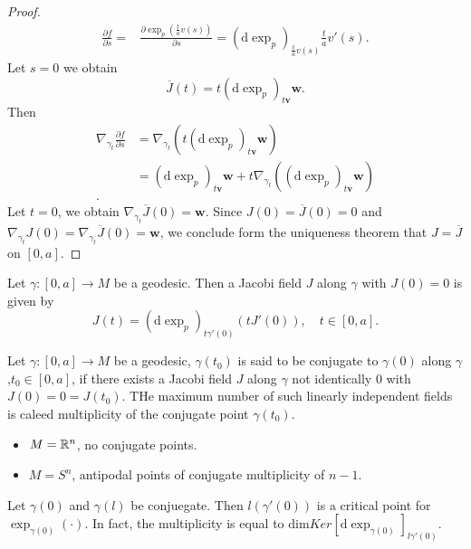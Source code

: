 \begin{proof}
  \begin{align*}
    \frac{\partial f}{\partial s} =& \frac{\partial \exp_p\left( \frac{t}{a}v(s) \right) }{\partial s}=(\mathrm{d}\exp_p)_{ \frac{t}{a}v(s)} \frac{t}{a}v'(s) 
  .\end{align*}
  Let $s=0$ we obtain
  \[
    \overline{J}(t)=t\left( \mathrm{d}\exp_p \right) _{t \mathbf{v}}\mathbf{w}.
  \] 
  Then
  \begin{align*}
    \nabla _{\gamma_t} \frac{\partial f}{\partial s} &= \nabla _{\gamma_t}\left( t\left( \mathrm{d}\exp_p \right) _{t\mathbf{v}}\mathbf{w} \right)  \\
    &= \left( \mathrm{d}\exp_p \right) _{t\mathbf{v}} \mathbf{w}+ t \nabla _{\gamma_t}\left( \left( \mathrm{d}\exp_p \right) _{t\mathbf{v}}\mathbf{w} \right)    \\
  .\end{align*}
  Let $t=0$, we obtain $\nabla _{\gamma_t} \overline{J}(0)=\mathbf{w}$. Since $J(0)=\overline{J}(0)=0$ and $\nabla _{\gamma_t}J(0)=\nabla _{\gamma_t}\overline{J}(0)=\mathbf{w}$, we conclude form the uniqueness theorem that $J=\overline{J}$ on $[0,a]$.
\end{proof}
\begin{corollary}
  Let $\gamma:[0,a]\to M$ be a geodesic. Then a Jacobi field $J$ along $\gamma$ with $J(0)=0$ is given by 
  \begin{equation}
    J(t)=\left( \mathrm{d}\exp_p \right) _{t\gamma'(0)}\left( tJ'(0) \right),\quad t\in[0,a]. 
  \end{equation}
\end{corollary}
\begin{definition}
  Let $\gamma:[0,a]\to M$ be a geodesic, $\gamma(t_0)$ is said to be conjugate to $\gamma(0)$ along $\gamma$,$t_0\in[0,a]$, if there exists a Jacobi field $J$ along $\gamma$ not identically $0$ with $J(0)=0=J(t_0)$. THe maximum number of such linearly independent fields is caleed multiplicity of the conjugate point $\gamma(t_0)$.
\end{definition}
\begin{example}
  \begin{itemize}
    \item $M=\mathbb{R}^{n}$, no conjugate points.
    \item $M=S^n$, antipodal points of conjugate multiplicity of $n-1$.
  \end{itemize}
\end{example}
\begin{proposition}
  Let $\gamma(0)$ and $\gamma(l)$ be conjuegate. Then $l\left( \gamma'(0) \right) $ is a critical point for $\exp_{\gamma(0)}(\cdot )$. In fact, the multiplicity is equal to $\mathrm{dim}{Ker}[\mathrm{d}\exp_{\gamma(0)}]_{l\gamma'(0)}$.
\end{proposition}

